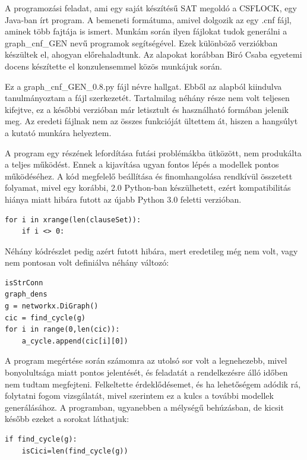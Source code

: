\documentclass[
]{thesis-ekf}
\theoremstyle{definition}
\theoremstyle{remark}
\begin{document}
	A programozási feladat, ami egy saját készítésű \textsc{SAT} megoldó a CSFLOCK, egy Java-ban írt program. A bemeneti formátuma, amivel dolgozik az egy .cnf fájl, aminek több fajtája is ismert. Munkám során ilyen fájlokat tudok generálni a graph\_cnf\_GEN nevű programok segítségével. Ezek különböző verziókban készültek el, ahogyan előrehaladtunk. Az alapokat korábban Biró Csaba egyetemi docens készítette el konzulensemmel közös munkájuk során.
	
	Ez a graph\_cnf\_GEN\_0.8.py \cite{github-py08} fájl névre hallgat. Ebből az alapból kiindulva tanulmányoztam a fájl szerkezetét. Tartalmilag néhány része nem volt teljesen kifejtve, ez a későbbi verzióban már letisztult és használható formában jelenik meg. Az eredeti fájlnak nem az összes funkcióját ültettem át, hiszen a hangsúlyt a kutató munkára helyeztem.
	
	A program egy részének lefordítása futási problémákba ütközött, nem produkálta a teljes működést. Ennek a kijavítása ugyan fontos lépés a modellek pontos működéséhez. A kód megfelelő beállítása és finomhangolása rendkívül összetett folyamat, mivel  egy korábbi, 2.0 Python-ban készülhetett, ezért kompatibilitás hiánya miatt hibára futott az újabb Python 3.0 feletti verzióban.
	
	\begin{lstlisting}
for i in xrange(len(clauseSet)):
	if i <> 0:
	\end{lstlisting}

	Néhány kódrészlet pedig azért futott hibára, mert eredetileg még nem volt, vagy nem pontosan volt definiálva néhány változó:
	
	\begin{lstlisting}
isStrConn
graph_dens
g = networkx.DiGraph()
cic = find_cycle(g)
for i in range(0,len(cic)):
	a_cycle.append(cic[i][0])
	\end{lstlisting}

	A program megértése során számomra az utolsó sor volt a legnehezebb, mivel bonyolultsága miatt pontos jelentését, és feladatát a rendelkezésre álló időben nem tudtam megfejteni. Felkeltette érdeklődésemet, és ha lehetőségem adódik rá, folytatni fogom vizsgálatát, mivel szerintem ez a kulcs a további modellek generálásához. A programban, ugyanebben a mélységű behúzásban, de kicsit később ezeket a sorokat láthatjuk:
	
	\begin{lstlisting}
if find_cycle(g):
	isCici=len(find_cycle(g))
	\end{lstlisting}
\end{document}
